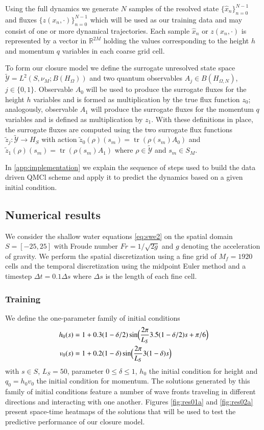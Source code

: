 \documentclass[letterpaper,10pt,3p,preprint]{elsarticle}
\newcommand{\Rbb}{\mathbb{R}}
\newcommand{\Ycal}{\mathcal{Y}}
\DeclareMathOperator{\tr}{tr}
\begin{document}
Using the full dynamics we generate $N$ samples of the resolved state
$\{\hat{x}_n\}_{n=0}^{N-1}$ and fluxes
$\{z(x_n,\cdot)\}_{n=0}^{N-1}$
which will be used as our training data
and may consist of one or more dynamical trajectories.
Each sample $\hat{x}_n$ or $z(x_n,\cdot)$
is represented by a vector in $\Rbb^{2M}$
holding the values corresponding to the height
$h$ and momentum $q$ variables in each coarse grid cell.

To form our closure model we define
the surrogate unresolved state space
$\tilde{\Ycal}=L^2(S,\nu_M;B(H_\Omega))$
and two quantum observables
$A_j\in B(H_{\Omega,N})$, $j\in\{0,1\}$.
Observable $A_0$ will be used to produce the surrogate fluxes
for the height $h$ variables and is formed as multiplication by
the true flux function $z_0$;
analogously, observable $A_1$ will produce the surrogate fluxes
for the momentum $q$ variables and is defined as multiplication
by $z_1$.
With these definitions in place, the surrogate fluxes are
computed using the two surrogate flux functions
$\tilde{z}_j\colon\tilde{\Ycal}\to H_S$
with action
$\tilde{z}_0(\rho)(s_m)=\tr(\rho(s_m)A_0)$
and
$\tilde{z}_1(\rho)(s_m)=\tr(\rho(s_m)A_1)$
where $\rho\in\tilde{\Ycal}$
and $s_m\in S_M$.

In \ref{app:implementation} we explain the sequence of
steps used to build the data driven QMCl scheme and apply
it to predict the dynamics based on a given initial condition.

\subsection{Numerical results}\label{sec:numerics}
We consider the shallow water equations
\eqref{eq:swe2}
on the spatial domain $S=[-25,25]$
with Froude number $Fr=1/\sqrt{2g}$
and $g$ denoting the acceleration of gravity.
We perform the spatial discretization using a fine grid of
$M_f=1920$ cells and the temporal discretization using the
midpoint Euler method and a timestep $\Delta t=0.1\Delta s$
where $\Delta s$ is the length of each fine cell.

\subsubsection*{Training}
We define the one-parameter family of initial conditions
\begin{equation}\label{eq:ic-family}
\begin{aligned}
    h_0(s) &= 1 + 0.3(1-\delta/2)\sin\Bigl(\frac{2\pi}{L_S}
        3.5(1-\delta/2)s+\pi/6\Bigr)\\
    v_0(s) &= 1 + 0.2(1-\delta)\sin\Bigl(\frac{2\pi}{L_S}
        3(1-\delta)s\Bigr)
\end{aligned}
\end{equation}
with $s\in S$, $L_S=50$, parameter $0\leq\delta\leq1$,
$h_0$ the initial condition for height and
$q_0=h_0v_0$ the initial condition for momentum.
The solutions generated by this family of initial conditions
feature a number of wave fronts traveling in different directions
and interacting with one another.
Figures \ref{fig:res01a} and \ref{fig:res02a}
present space-time heatmaps of the solutions that will be used
to test the predictive performance of our closure model.
\end{document}

